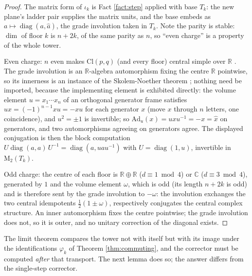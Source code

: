 \documentclass[11pt]{article}
\theoremstyle{definition}
\newcommand{\Cl}{\mathrm{Cl}}
\newcommand{\R}{\mathbb{R}}
\newcommand{\C}{\mathbb{C}}
\newcommand{\Mat}{\mathrm{M}}
\newcommand{\Ad}{\mathrm{Ad}}
\begin{document}
\begin{proof}
The matrix form of $\iota_k$ is Fact \ref{fact:step} applied with base $T_k$: the new plane's ladder pair supplies the matrix units, and the base embeds as $a \mapsto \operatorname{diag}(a, \hat a)$, the grade involution taken in $T_k$. Note the parity is stable: $\dim$ of floor $k$ is $n + 2k$, of the same parity as $n$, so ``even charge'' is a property of the whole tower.

Even charge: $n$ even makes $\Cl(p,q)$ (and every floor) central simple over $\R$ \cite{Porteous1995, Lounesto2001}. The grade involution is an $\R$-algebra automorphism fixing the centre $\R$ pointwise, so its innerness is an instance of the Skolem-Noether theorem \cite{Pierce1982}; nothing need be imported, because the implementing element is exhibited directly: the volume element $u = x_1 \cdots x_n$ of an orthogonal generator frame satisfies $u x = (-1)^{n-1} x u = -xu$ for each generator $x$ (move $x$ through $n$ letters, one coincidence), and $u^2 = \pm 1$ is invertible; so $\Ad_u(x) = u x u^{-1} = -x = \hat x$ on generators, and two automorphisms agreeing on generators agree. The displayed conjugation is then the block computation $U \operatorname{diag}(a,a)\, U^{-1} = \operatorname{diag}(a, u a u^{-1})$ with $U = \operatorname{diag}(1, u)$, invertible in $\Mat_2(T_k)$.

Odd charge: the centre of each floor is $\R \oplus \R$ ($d \equiv 1 \bmod 4$) or $\C$ ($d \equiv 3 \bmod 4$), generated by $1$ and the volume element $\omega$, which is odd (its length $n + 2k$ is odd) and is therefore sent by the grade involution to $-\omega$: the involution exchanges the two central idempotents $\tfrac12(1 \pm \omega)$, respectively conjugates the central complex structure. An inner automorphism fixes the centre pointwise; the grade involution does not, so it is outer, and no unitary correction of the diagonal exists.
\end{proof}

The limit theorem compares the tower not with itself but with its image under the identifications $\varphi_k$ of Theorem \ref{thm:commuting}, and the corrector must be computed \emph{after} that transport. The next lemma does so; the answer differs from the single-step corrector.
\end{document}

